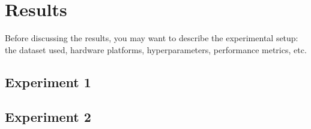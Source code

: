 \chapter{Results}

Before discussing the results, you may want to describe the experimental setup: the dataset used, hardware platforms, hyperparameters, performance metrics, etc.

\section{Experiment 1}

\lipsum  %

\section{Experiment 2}

\lipsum  %

